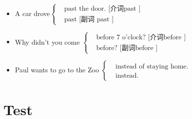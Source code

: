 \begin{itemize}
\item A car drove$ \left\{
    \begin{aligned}
      &\text{past the door. [介词past ]} \\
      &\text{past [副词 past ]}
    \end{aligned}
  \right. $

\item Why didn't you come $ \left\{
    \begin{aligned}
	    &\text{before 7 o'clock? [介词before ]} \\
      &\text{before? [副词before ]}
    \end{aligned}
    \right. $

  \item Paul wants to go to the Zoo $ \left\{
      \begin{aligned}
        &\text{instead of staying home.} \\
        &\text{instead.}
      \end{aligned}
  \right. $
\end{itemize}


\section{Test}

